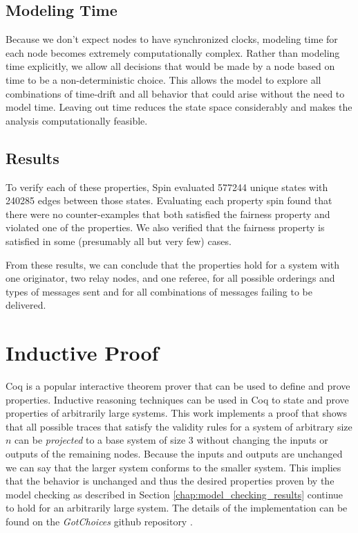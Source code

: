 \documentclass[runningheads]{llncs}
\begin{document}
\subsection{Modeling Time}
\label{sec:model_time}
Because we don't expect nodes to have synchronized clocks, modeling time for each node becomes extremely computationally complex. Rather than modeling time explicitly, we allow all decisions that would be made by a node based on time to be a non-deterministic choice. This allows the model to explore all combinations of time-drift and all behavior that could arise without the need to model time. Leaving out time reduces the state space considerably and makes the analysis computationally feasible. 

\subsection{Results}

To verify each of these properties, Spin evaluated 
577244 unique states with 240285 edges between those states. Evaluating each property spin found that there were no counter-examples that both satisfied the fairness property and violated one of the properties. We also verified that the fairness property is satisfied in some (presumably all but very few) cases. 

From these results, we can conclude that the properties hold for a system with one originator, two relay nodes, and one referee, for all possible orderings and types of messages sent and for all combinations of messages failing to be delivered.

\section{Inductive Proof} \label{chap:coq_results}

Coq is a popular interactive theorem prover that can be used to define and prove properties. Inductive reasoning techniques can be used in Coq to state and prove properties of arbitrarily large systems. This work implements a proof that shows that all possible traces that satisfy the validity rules for a system of arbitrary size $n$ can be \emph{projected} to a base system of size $3$ without changing the inputs or outputs of the remaining nodes. Because the inputs and outputs are unchanged we can say that the larger system conforms to the smaller system. This implies that the behavior is unchanged and thus the desired properties proven by the model checking as described in Section \ref{chap:model_checking_results} continue to hold for an arbitrarily large system.
The details of the implementation can be 
found on the \emph{GotChoices} github repository \cite{bateman_myCHIPs}. 
\end{document}
